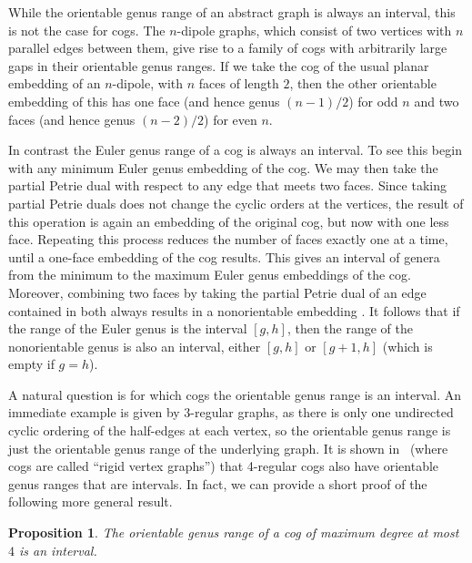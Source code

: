 \documentclass{amsart}
\newtheorem{proposition}[theorem]{Proposition}
\theoremstyle{definition}
\theoremstyle{remark}
\numberwithin{equation}{section}
\begin{document}
\begin{enumerate}
While the orientable genus range of an abstract graph is always an interval, this is not the case for cogs. 
The $n$-dipole graphs, which consist of two vertices with $n$ parallel edges between them, give rise to a family of cogs with arbitrarily large gaps in their orientable genus ranges. 
If we take the cog of the usual planar embedding of an $n$-dipole, with $n$ faces of length $2$, then the other orientable embedding of this has one face (and hence genus $(n-1)/2$) for odd $n$ and two faces (and hence genus $(n-2)/2$) for even $n$.

In contrast the Euler genus range of a cog is always an interval.
To see this begin with any minimum Euler genus embedding of the cog.  We may then take the partial Petrie dual with respect to any edge that meets two faces.  Since taking partial Petrie duals does not change the cyclic orders at the vertices, the result of this operation is again an embedding of the original cog, but now with one less face.  Repeating this process reduces the number of faces exactly one at a time, until a one-face embedding of the cog results.  This gives an interval of genera from the minimum to the maximum Euler genus embeddings of the cog.
 Moreover, combining two faces by taking the partial Petrie dual of an edge contained in both always results in a nonorientable embedding \cite[Lemma 6(a)]{Sta78}.  It follows that if the range of the Euler genus is the interval $[g, h]$, then the range of the nonorientable genus is also an interval, either $[g, h]$ or $[g+1, h]$ (which is empty if $g=h$).

A natural question is for which cogs the orientable genus range is an interval.  An immediate example is given by $3$-regular graphs, as there is only one undirected cyclic ordering of the half-edges at each vertex, so the orientable genus range is just the orientable genus range of the underlying graph.
It is shown in~\cite[Lemma 4]{B+15} (where cogs are called ``rigid vertex graphs'') that 4-regular cogs also have orientable genus ranges that are intervals.
In fact, we can provide a short proof of the following more general result.


\begin{proposition} The orientable genus range of a cog of maximum degree at most $4$ is an interval.
\end{proposition}


\end{enumerate}
\end{document}
